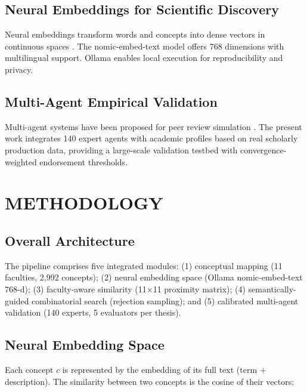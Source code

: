 \documentclass[a4paper,12pt]{article}
\begin{document}
\subsection{Neural Embeddings for Scientific Discovery}

Neural embeddings transform words and concepts into dense vectors in continuous spaces 
\cite{mikolov2013, pennington2014, devlin2019}. The nomic-embed-text model 
\cite{nomic2024} offers 768 dimensions with multilingual support. Ollama 
\cite{ollama2024} enables local execution for reproducibility and privacy.

\subsection{Multi-Agent Empirical Validation}

Multi-agent systems have been proposed for peer review simulation \cite{shah2022, zhang2024}. 
The present work integrates 140 expert agents with academic profiles based on real 
scholarly production data, providing a large-scale validation testbed with 
convergence-weighted endorsement thresholds.


\section{METHODOLOGY}\label{sec:methodology}

\subsection{Overall Architecture}

The pipeline comprises five integrated modules: (1) conceptual mapping (11 faculties, 
2,992 concepts); (2) neural embedding space (Ollama nomic-embed-text 768-d); 
(3) faculty-aware similarity (11$\times$11 proximity matrix); (4) semantically-guided 
combinatorial search (rejection sampling); and (5) calibrated multi-agent validation 
(140 experts, 5 evaluators per thesis).

\subsection{Neural Embedding Space}

Each concept $c$ is represented by the embedding of its full text (term + description). 
The similarity between two concepts is the cosine of their vectors:
\end{document}
